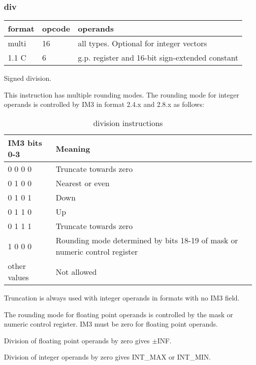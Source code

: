 \documentclass[forwardcom.tex]{subfiles}
\begin{document}
\subsubsection{div}
\label{table:divInstruction}
\begin{tabular}{|p{12mm}|p{12mm}|p{110mm}|}
\hline
\bfseries format & \bfseries opcode & \bfseries operands \\ \hline
multi & 16 & all types. Optional for integer vectors \\ \hline
1.1 C &  6 & g.p. register and 16-bit sign-extended constant \\ \hline
\end{tabular}
\vspace{2mm}

Signed division.

\vspace{2mm}
This instruction has multiple rounding modes. The rounding mode for integer operands is controlled by IM3 in format 2.4.x and 2.8.x as follows:

\begin{longtable} {|p{25mm}|p{80mm}|}
\caption{division instructions} 
\label{table:DivInstructions} \\
\endfirsthead
\endhead
\hline
\bfseries IM3 bits 0-3 & \bfseries Meaning   \\
\hline
 0 0 0 0 & Truncate towards zero \\
\hline
 0 1 0 0 & Nearest or even \\
 0 1 0 1 & Down \\
 0 1 1 0 & Up \\
 0 1 1 1 & Truncate towards zero \\
\hline
 1 0 0 0 & Rounding mode determined by bits 18-19 of mask or numeric control register \\
\hline
other values & Not allowed \\ 
\hline
\end{longtable}
Truncation is always used with integer operands in formats with no IM3 field.

\vspace{2mm}
The rounding mode for floating point operands is controlled by the mask or numeric control register. IM3 must be zero for floating point operands.

\vspace{2mm}
Division of floating point operands by zero gives $\pm$INF.

Division of integer operands by zero gives INT\_MAX or INT\_MIN.
\end{document}
